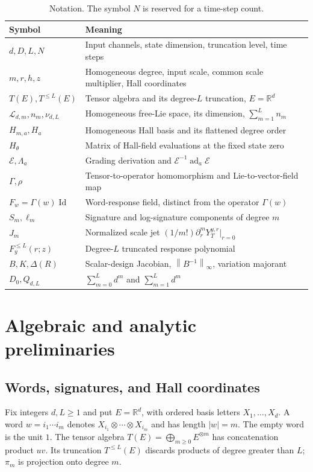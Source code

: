 \documentclass[11pt,a4paper]{article}
\numberwithin{equation}{section}
\theoremstyle{definition}
\theoremstyle{remark}
\DeclareMathOperator{\Id}{Id}
\newcommand{\R}{\mathbb R}
\newcommand{\Lie}{\mathcal L}
\newcommand{\norm}[1]{\left\lVert #1\right\rVert}
\begin{document}
\begin{table}[htbp]
\centering
\caption{Notation. The symbol $N$ is reserved for a time-step count.}
\label{tab:notation}
\begin{tabularx}{\textwidth}{@{}lX@{}}
\toprule
Symbol & Meaning \\
\midrule
$d,D,L,N$ & Input channels, state dimension, truncation level, time steps \\
$m,r,h,z$ & Homogeneous degree, input scale, common scale multiplier, Hall coordinates \\
$T(E),T^{\leq L}(E)$ & Tensor algebra and its degree-$L$ truncation, $E=\R^d$ \\
$\Lie_{d,m},n_m,\nu_{d,L}$ & Homogeneous free-Lie space, its dimension, $\sum_{m=1}^L n_m$ \\
$H_{m,a},H_a$ & Homogeneous Hall basis and its flattened degree order \\
$H_\theta$ & Matrix of Hall-field evaluations at the fixed state zero \\
$\mathcal E,\Lambda_a$ & Grading derivation and $\mathcal E^{-1}\operatorname{ad}_a\mathcal E$ \\
$\Gamma,\rho$ & Tensor-to-operator homomorphism and Lie-to-vector-field map \\
$F_w=\Gamma(w)\Id$ & Word-response field, distinct from the operator $\Gamma(w)$ \\
$S_m,\ell_m$ & Signature and log-signature components of degree $m$ \\
$J_m$ & Normalized scale jet $(1/m!)\partial_r^mY_T^{y,r}|_{r=0}$ \\
$F_y^{\leq L}(r;z)$ & Degree-$L$ truncated response polynomial \\
$B,K,\Delta(R)$ & Scalar-design Jacobian, $\norm{B^{-1}}_\infty$, variation majorant \\
$D_0,Q_{d,L}$ & $\sum_{m=0}^L d^m$ and $\sum_{m=1}^L d^m$ \\
\bottomrule
\end{tabularx}
\end{table}

\section{Algebraic and analytic preliminaries}
\label{sec:prelim}
\subsection{Words, signatures, and Hall coordinates}
Fix integers $d,L\geq1$ and put $E=\R^d$, with ordered basis letters
$X_1,\ldots,X_d$. A word $w=i_1\cdots i_m$ denotes
$X_{i_1}\otimes\cdots\otimes X_{i_m}$ and has length $|w|=m$.
The empty word is the unit $1$. The tensor algebra
$T(E)=\bigoplus_{m\geq0}E^{\otimes m}$ has concatenation product $uv$.
Its truncation $T^{\leq L}(E)$ discards products of degree greater than $L$;
$\pi_m$ is projection onto degree $m$.
\end{document}
